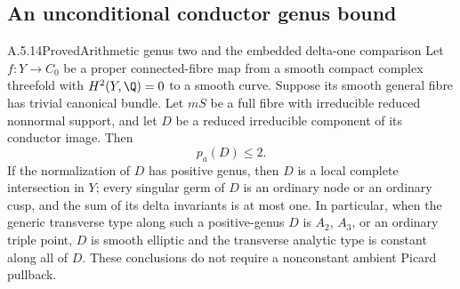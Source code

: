 

\subsection{An unconditional conductor genus bound}

\begin{statement}{A.5.14}{Proved}{Arithmetic genus two and the embedded delta-one comparison}
Let $f:Y\to C_0$ be a proper connected-fibre map from a
smooth compact complex threefold with $H^2(Y,\Q)=0$ to
a smooth curve. Suppose its smooth general fibre has
trivial canonical bundle. Let $mS$ be a full fibre with
irreducible reduced nonnormal support, and let $D$ be
a reduced irreducible component of its conductor image.
Then
\[
                         p_a(D)\le2.                \tag{A.J.30}
\]
If the normalization of $D$ has positive genus, then
$D$ is a local complete intersection in $Y$; every
singular germ of $D$ is an ordinary node or an ordinary
cusp, and the sum of its delta invariants is at most
one. In particular, when the generic transverse type
along such a positive-genus $D$ is $A_2$, $A_3$, or an
ordinary triple point, $D$ is smooth elliptic and the
transverse analytic type is constant along all of $D$.
These conclusions do not require a nonconstant ambient
Picard pullback.
\end{statement}
